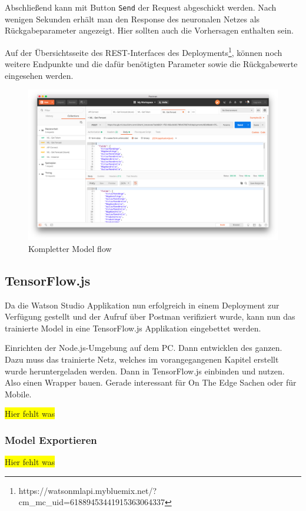 Abschließend kann mit Button \texttt{Send} der Request abgeschickt werden. Nach wenigen Sekunden erhält man den Response
des neuronalen Netzes als Rückgabeparameter angezeigt. Hier sollten auch die Vorhersagen enthalten sein.

Auf der Übersichtsseite des REST-Interfaces des
Deployments\footnote{https://watson\-ml\-api.mybluemix.net/?cm\_mc\_uid=61889453441915363064337}, können noch weitere
Endpunkte und die dafür benötigten Parameter sowie die Rückgabewerte eingesehen werden.

\begin{figure}[h]
\centering
\includegraphics[scale=0.26]{images/kapitel_3/deployment_postman.png}
\caption{Kompletter Model flow}
\label{fig:umsetzung_model_flow}
\end{figure}

\subsection{TensorFlow.js}
Da die Watson Studio Applikation nun erfolgreich in einem Deployment zur Verfügung gestellt und der Aufruf über
Postman verifiziert wurde, kann nun das trainierte Model in eine TensorFlow.js Applikation eingebettet werden.

Einrichten der Node.js-Umgebung auf dem PC. Dann entwicklen des ganzen. Dazu muss das trainierte Netz, welches im
vorangegangenen Kapitel erstellt wurde heruntergeladen werden. Dann in TensorFlow.js einbinden und nutzen. Also einen
Wrapper bauen. Gerade interessant für On The Edge Sachen oder für Mobile.

\colorbox{yellow}{Hier fehlt was}

\subsubsection{Model Exportieren}
\colorbox{yellow}{Hier fehlt was}


